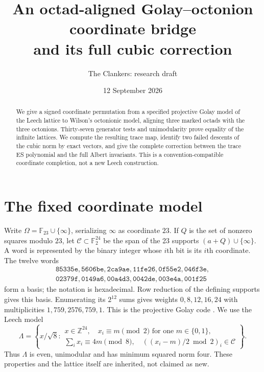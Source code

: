 \documentclass[10pt,reqno]{amsart}
\title{An octad-aligned Golay--octonion coordinate bridge\\
and its full cubic correction}
\author{The Clankers: research draft}
\date{12 September 2026}
\theoremstyle{remark}\newtheorem{remark}[theorem]{Remark}
\newcommand{\Z}{\mathbb Z}\newcommand{\Q}{\mathbb Q}\newcommand{\R}{\mathbb R}\newcommand{\F}{\mathbb F}
\newcommand{\La}{\Lambda}\newcommand{\tr}{\operatorname{tr}}
\begin{document}
\begin{abstract}
We give a signed coordinate permutation from a specified projective Golay model of the Leech lattice to Wilson's octonionic model, aligning three marked octads with the three octonions. Thirty-seven generator tests and unimodularity prove equality of the infinite lattices. We compute the resulting trace map, identify two failed descents of the cubic norm by exact vectors, and give the complete correction between the trace ES polynomial and the full Albert invariants. This is a convention-compatible coordinate completion, not a new Leech construction.
\end{abstract}
\maketitle
\section{The fixed coordinate model}
Write $\Omega=\F_{23}\cup\{\infty\}$, serializing $\infty$ as coordinate $23$. If $Q$ is the set of nonzero squares modulo $23$, let $\mathcal C\subset\F_2^{24}$ be the span of the 23 supports $(a+Q)\cup\{\infty\}$. A word is represented by the binary integer whose $i$th bit is its $i$th coordinate. The twelve words
\[
\begin{gathered}
\mathtt{85335e,
5606be,
2ca9ae,
11fe26,
0f55e2,
046f3e,}\\
\mathtt{02379f,
0149a6,
00a4d3,
0042de,
003e4a,
001f25}
\end{gathered}
\]
form a basis; the notation is hexadecimal. Row reduction of the defining supports gives this basis. Enumerating its $2^{12}$ sums gives weights $0,8,12,16,24$ with multiplicities $1,759,2576,759,1$. This is the projective Golay code \cite{chapman}. We use the Leech model \cite[Theorem 1.4]{brouwer}
\begin{equation}\label{eq:model}
\La=\left\{x/\sqrt8:\begin{array}{l}x\in\Z^{24},\quad x_i\equiv m\pmod2\text{ for one }m\in\{0,1\},\\
\sum_i x_i\equiv4m\pmod8,\quad ((x_i-m)/2\bmod2)_i\in\mathcal C\end{array}\right\}.
\end{equation}
Thus $\La$ is even, unimodular and has minimum squared norm four. These properties and the lattice itself are inherited, not claimed as new.
\end{document}
